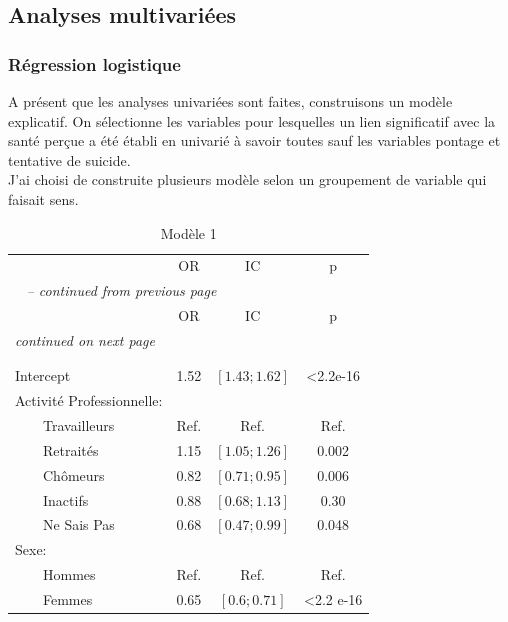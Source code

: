 \documentclass{book}
\begin{document}
\subsection{Analyses multivariées}
\subsubsection{Régression logistique}

\noindent
A présent que les analyses univariées sont faites, construisons un modèle explicatif. On sélectionne les variables pour lesquelles un lien significatif avec la santé perçue a été établi en univarié à savoir toutes sauf les variables pontage et tentative de suicide.\\

\bigskip
\noindent
J'ai choisi de construite plusieurs modèle selon un groupement de variable qui faisait sens.\\

\begin{longtable}{lccc}\caption{Modèle 1}\\
    \hline  
		& \multirow{2}{*}{OR} & \multirow{2}{*}{IC}& \multirow{2}{*}{p}\\ 
		 &    				    &    			    &                  \\ 
   \hline
    \hline     
    \endfirsthead 
    \multicolumn{4}{l}{\tablename\ \thetable{} \textit{-- continued from previous page}}\\ 
    \hline
		& \multirow{2}{*}{OR} & \multirow{2}{*}{IC}& \multirow{2}{*}{p}\\ 
		&    				    &    			    &                  \\ 
    \hline
    \hline  
    \endhead   
    \hline
    \multicolumn{4}{l}{\textit{continued on next page}} \\ 
    &    				    &    			    &                  \\ 
    \endfoot   
    \multicolumn{4}{l}{}  \\ 
    \endlastfoot  
Intercept & 1.52 & $\left[1.43 ; 1.62 \right]$ & <2.2e-16\\
Activité Professionnelle: &              &              &	\\ 
$\qquad$Travailleurs 		&		Ref.		& 	Ref.		&	Ref.\\ 
$\qquad$Retraités&1.15 &$\left[1.05 ; 1.26 \right]$ & 0.002\\ 
$\qquad$Chômeurs & 0.82& $\left[0.71 ; 0.95\right]$& 0.006\\ 
$\qquad$Inactifs  & 0.88& $\left[0.68 ; 1.13\right]$& 0.30\\ 
$\qquad$Ne Sais Pas & 0.68& $\left[0.47 ; 0.99\right]$ & 0.048 \\ 
Sexe: &              &              &                          \\ 
$\qquad$Hommes &Ref. & Ref.& Ref.\\ 
$\qquad$Femmes & 0.65& $\left[0.6 ; 0.71 \right]$ & <2.2 e-16\\ 

 
    \hline
    \end{longtable} 
\end{document}
